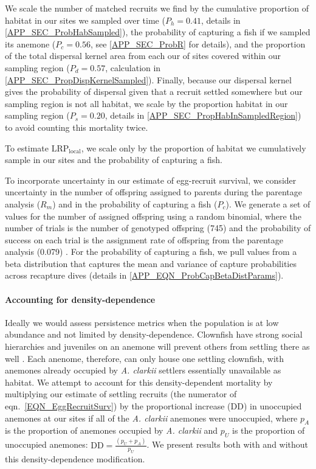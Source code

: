 \documentclass[12pt, oneside]{article}   	%
\begin{document}
We scale the number of matched recruits we find by the cumulative proportion of habitat in our sites we sampled over time ($P_h = 0.41$, details in \ref{APP_SEC_ProbHabSampled}),
the probability of capturing a fish if we sampled its anemone ($P_c = 0.56$, see \ref{APP_SEC_ProbR} for details), and the proportion of the total dispersal kernel area from each our of sites covered within our sampling region ($P_d =0.57$, calculation in \ref{APP_SEC_PropDispKernelSampled}). Finally, because our dispersal kernel gives the probability of dispersal given that a recruit settled somewhere but our sampling region is not all habitat, we scale by the proportion habitat in our sampling region ($P_s = 0.20$, details in \ref{APP_SEC_PropHabInSampledRegion}) to avoid counting this mortality twice. 

To estimate $\text{LRP}_\text{local}$, we scale only by the proportion of habitat we cumulatively sample in our sites and the probability of capturing a fish.

To incorporate uncertainty in our estimate of egg-recruit survival, we consider uncertainty in the number of offspring assigned to parents during the parentage analysis ($R_m$) and in the probability of capturing a fish ($P_c$). We generate a set of values for the number of assigned offspring using a random binomial, where the number of trials is the number of genotyped offspring (745) and the probability of success on each trial is the assignment rate of offspring from the parentage analysis (0.079) \citep{catalanoInPrepconnectivity}. For the probability of capturing a fish, we pull values from a beta distribution that captures the mean and variance of capture probabilities across recapture dives (details in \ref{APP_EQN_ProbCapBetaDistParams}).

\paragraph*{Accounting for density-dependence}  %

Ideally we would assess persistence metrics when the population is at low abundance and not limited by density-dependence. Clownfish have strong social hierarchies and juveniles on an anemone will prevent others from settling there as well \citep[seen in \textit{A. percula,}][]{buston2003forcible}. Each anenome, therefore, can only house one settling clownfish, with anemones already occupied by \textit{A. clarkii} settlers essentially unavailable as habitat. We attempt to account for this density-dependent mortality by multiplying our estimate of settling recruits (the numerator of eqn.\ \ref{EQN_EggRecruitSurv}) by the proportional increase ($\text{DD}$) in unoccupied anemones at our sites if all of the \textit{A. clarkii} anemones were unoccupied, where $p_A$ is the proportion of anemones occupied by \textit{A. clarkii} and $p_U$ is the proportion of unoccupied anemones: $\text{DD} = \frac{(p_U + p_A)}{p_U}$. We present results both with and without this density-dependence modification.
\end{document}
